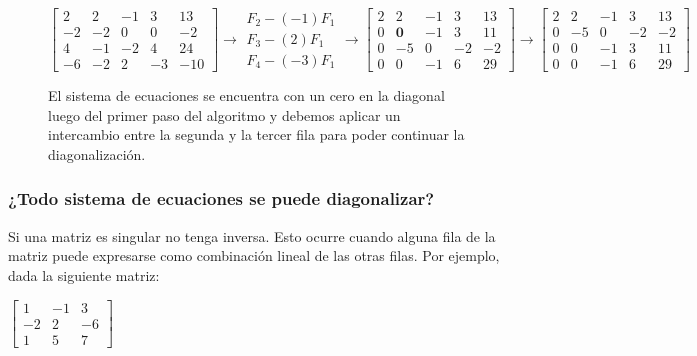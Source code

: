 \begin{figure}[H]
    $$
    \left[\begin{array}{cccc|c}
    2 & 2 & -1 & 3 & 13 \\
    -2 & -2 & 0 & 0 & -2 \\
    4 & -1 & -2 & 4 & 24 \\
    -6 & -2 & 2 & -3 & -10
    \end{array}\right] \rightarrow \begin{gathered}
    F_2-(-1) F_1 \\
    F_3-(2) F_1 \\
    F_4-(-3) F_1
    \end{gathered} \longrightarrow\left[\begin{array}{cccc|c}
    2 & 2 & -1 & 3 & 13 \\
    0 & \textbf{0} & -1 & 3 & 11 \\
    0 & -5 & 0 & -2 & -2 \\
    0 & 0 & -1 & 6 & 29
    \end{array}\right]\longrightarrow\left[\begin{array}{cccc|c}
    2 & 2 & -1 & 3 & 13 \\
    0 & -5 & 0 & -2 & -2 \\
    0 & 0 & -1 & 3 & 11 \\
    0 & 0 & -1 & 6 & 29
    \end{array}\right]
    $$
    
    \caption{El sistema de ecuaciones se encuentra con un cero en la diagonal luego del primer paso del algoritmo y debemos aplicar un intercambio entre la segunda y la tercer fila para poder continuar la diagonalización.}
    \label{fig:pivoting}

\end{figure}

\subsubsection{¿Todo sistema de ecuaciones se puede diagonalizar?}
\label{sec:sin_solucion}

Si una matriz es singular no tenga inversa. Esto ocurre cuando alguna fila de la matriz puede expresarse como combinación lineal de las otras filas. Por ejemplo, dada la siguiente matriz:

\begin{center}
$\begin{bmatrix}
1 & -1 & 3\\
-2 & 2 & -6\\
1 & 5 & 7
\end{bmatrix}$
\end{center}

